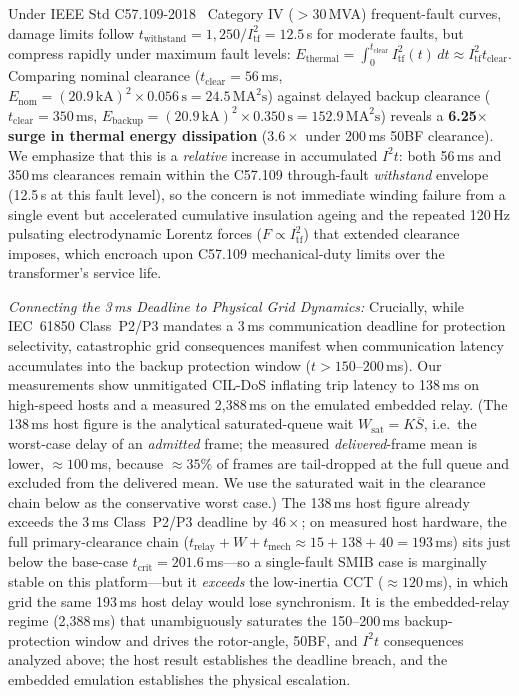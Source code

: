 \documentclass[journal]{IEEEtran}
\begin{document}
Under IEEE Std C57.109-2018~\cite{ieeec57109} Category IV ($>30$\,MVA) frequent-fault curves, damage limits follow $t_{\text{withstand}} = 1{,}250 / I_{\text{tf}}^2 = 12.5$\,s for moderate faults, but compress rapidly under maximum fault levels: $E_{\text{thermal}} = \int_0^{t_{\text{clear}}} I_{\text{tf}}^2(t) \, dt \approx I_{\text{tf}}^2 t_{\text{clear}}$. Comparing nominal clearance ($t_{\text{clear}} = 56$\,ms, $E_{\text{nom}} = (20.9\,\text{kA})^2 \times 0.056\,\text{s} = 24.5\,\text{MA}^2\text{s}$) against delayed backup clearance ($t_{\text{clear}} = 350$\,ms, $E_{\text{backup}} = (20.9\,\text{kA})^2 \times 0.350\,\text{s} = 152.9\,\text{MA}^2\text{s}$) reveals a \textbf{6.25$\times$ surge in thermal energy dissipation} ($3.6\times$ under 200\,ms 50BF clearance). We emphasize that this is a \emph{relative} increase in accumulated $I^2t$: both 56\,ms and 350\,ms clearances remain within the C57.109 through-fault \emph{withstand} envelope (12.5\,s at this fault level), so the concern is not immediate winding failure from a single event but accelerated cumulative insulation ageing and the repeated 120\,Hz pulsating electrodynamic Lorentz forces ($F \propto I_{\text{tf}}^2$) that extended clearance imposes, which encroach upon C57.109 mechanical-duty limits over the transformer's service life.

\textit{Connecting the 3\,ms Deadline to Physical Grid Dynamics:} Crucially, while IEC~61850 Class~P2/P3 mandates a 3\,ms communication deadline for protection selectivity, catastrophic grid consequences manifest when communication latency accumulates into the backup protection window ($t > 150\text{--}200$\,ms). Our measurements show unmitigated CIL-DoS inflating trip latency to 138\,ms on high-speed hosts and a measured 2,388\,ms on the emulated embedded relay. (The 138\,ms host figure is the analytical saturated-queue wait $W_{\text{sat}}=K\overline{S}$, i.e.\ the worst-case delay of an \emph{admitted} frame; the measured \emph{delivered}-frame mean is lower, $\approx 100$\,ms, because $\approx 35\%$ of frames are tail-dropped at the full queue and excluded from the delivered mean. We use the saturated wait in the clearance chain below as the conservative worst case.) The 138\,ms host figure already exceeds the 3\,ms Class~P2/P3 deadline by $46\times$; on measured host hardware, the full primary-clearance chain ($t_{\text{relay}} + W + t_{\text{mech}} \approx 15 + 138 + 40 = 193$\,ms) sits just below the base-case $t_{\text{crit}} = 201.6$\,ms---so a single-fault SMIB case is marginally stable on this platform---but it \emph{exceeds} the low-inertia CCT ($\approx 120$\,ms), in which grid the same 193\,ms host delay would lose synchronism. It is the embedded-relay regime (2,388\,ms) that unambiguously saturates the 150--200\,ms backup-protection window and drives the rotor-angle, 50BF, and $I^2t$ consequences analyzed above; the host result establishes the deadline breach, and the embedded emulation establishes the physical escalation.
\end{document}

